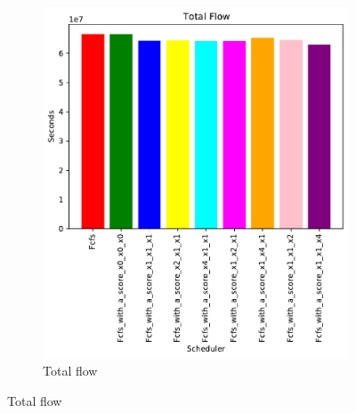 \documentclass[a4paper]{article}
\begin{document}
\begin{figure}[H]
	\begin{subfigure}[b]{0.4\linewidth}\centering\includegraphics[width=1\linewidth]{MBSS/plot/FCFS_Score_2022-03-26->2022-03-26_Total_flow_95_128_4_256_1_1024.pdf}\caption{Total flow}\end{subfigure}

\end{figure}
\end{document}
